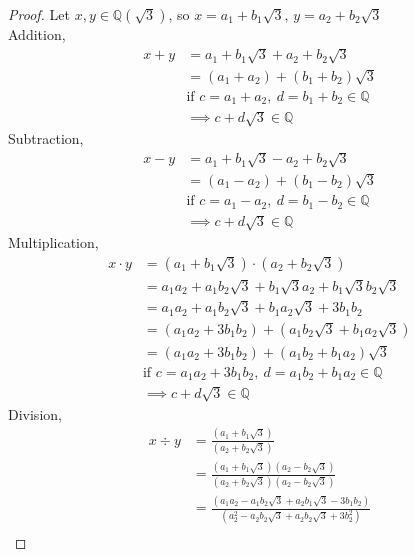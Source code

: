\documentclass[paper=usletter, fontsize=12pt]{article}
\begin{document}
\begin{itemize}
\begin{enumerate}
\begin{proof}
                Let $x,y \in \mathbb{Q}(\sqrt{3})$, so $x=a_1+b_1\sqrt{3}$,
                $y=a_2+b_2\sqrt{3}$\\
                Addition,
                \begin{align*}
                    x+y & = a_1+b_1\sqrt{3} + a_2+b_2\sqrt{3}\\
                    & = (a_1+a_2) + (b_1+b_2)\sqrt{3}\\
                    & \text{if } c = a_1+a_2, \ d=b_1+b_2 \in \mathbb{Q}\\
                    & \implies c+d\sqrt{3} \in \mathbb{Q}
                \end{align*}
                Subtraction,
                \begin{align*}
                    x-y & = a_1+b_1\sqrt{3} - a_2+b_2\sqrt{3}\\
                    & = (a_1-a_2) + (b_1-b_2)\sqrt{3}\\
                    & \text{if } c = a_1-a_2, \ d=b_1-b_2 \in \mathbb{Q}\\
                    & \implies c+d\sqrt{3} \in \mathbb{Q}
                \end{align*}
                Multiplication,
                \begin{align*}
                    x\cdot y & = (a_1+b_1\sqrt{3}) \cdot (a_2+b_2\sqrt{3})\\
                    & = a_1a_2+a_1b_2\sqrt{3} + b_1\sqrt{3}a_2+b_1\sqrt{3}b_2\sqrt{3}\\
                    & = a_1a_2+a_1b_2\sqrt{3} + b_1a_2\sqrt{3}+3b_1b_2\\
                    & = (a_1a_2+3b_1b_2) + (a_1b_2\sqrt{3} + b_1a_2\sqrt{3})\\
                    & = (a_1a_2+3b_1b_2) + (a_1b_2+b_1a_2)\sqrt{3}\\
                    & \text{if } c = a_1a_2+3b_1b_2, \ d=a_1b_2+b_1a_2 \in \mathbb{Q}\\
                    & \implies c+d\sqrt{3} \in \mathbb{Q}
                \end{align*}
                Division,
                \begin{align*}
                    x\div y & = \frac{(a_1+b_1\sqrt{3})}{(a_2+b_2\sqrt{3})}\\
                    & = \frac{(a_1+b_1\sqrt{3})(a_2-b_2\sqrt{3})}{(a_2+b_2\sqrt{3})(a_2-b_2\sqrt{3})}\\
                    & = \frac{(a_1a_2-a_1b_2\sqrt{3}+a_2b_1\sqrt{3}-3b_1b_2)}{(a_2^2-a_2b_2\sqrt{3}+a_2b_2\sqrt{3}+3b_2^2)}\\

\end{align*}
\end{proof}
\end{enumerate}
\end{itemize}
\end{document}
